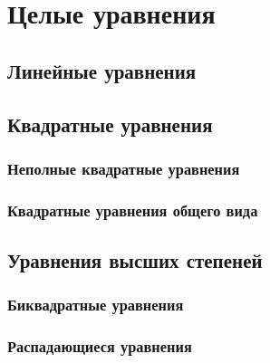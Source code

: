 \documentclass[10pt, a4paper]{article}
\begin{document}
\section{Целые уравнения}
	\subsection{Линейные уравнения}
	\subsection{Квадратные уравнения}
		\subsubsection{Неполные квадратные уравнения}
		\subsubsection{Квадратные уравнения общего вида}
	\subsection{Уравнения высших степеней}
		\subsubsection{Биквадратные уравнения}
		\subsubsection{Распадающиеся уравнения}
\end{document}
